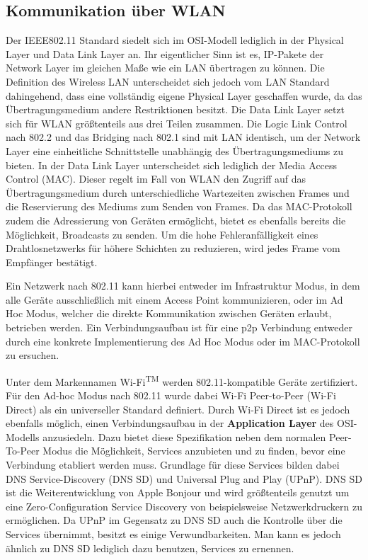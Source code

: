     \subsection{Kommunikation über WLAN}
        Der IEEE802.11 Standard siedelt sich im OSI-Modell lediglich in der Physical Layer und Data Link Layer an. Ihr eigentlicher Sinn ist es,
        IP-Pakete der Network Layer im gleichen Maße wie ein LAN übertragen zu können.
        Die Definition des Wireless LAN unterscheidet sich jedoch vom LAN Standard dahingehend, dass eine vollständig eigene Physical Layer geschaffen wurde,
        da das Übertragungsmedium andere Restriktionen besitzt. Die Data Link Layer setzt sich für WLAN größtenteils aus drei Teilen zusammen.
        Die Logic Link Control nach 802.2 und das Bridging nach 802.1 sind mit LAN identisch, um der Network Layer eine einheitliche Schnittstelle unabhängig des Übertragungsmediums zu bieten.
        In der Data Link Layer unterscheidet sich lediglich der Media Access Control (MAC).\cite[S.311]{Sauter}
        Dieser regelt im Fall von WLAN den Zugriff auf das Übertragungsmedium durch unterschiedliche Wartezeiten zwischen Frames und die Reservierung des Mediums zum Senden von Frames.
        Da das MAC-Protokoll zudem die Adressierung von Geräten ermöglicht, bietet es ebenfalls bereits die Möglichkeit, Broadcasts zu senden.
        Um die hohe Fehleranfälligkeit eines Drahtlosnetzwerks für höhere Schichten zu reduzieren, wird jedes Frame vom Empfänger bestätigt.\cite[S.325-327]{Sauter}
        
        Ein Netzwerk nach 802.11 kann hierbei entweder im Infrastruktur Modus, in dem alle Geräte ausschließlich mit einem Access Point kommunizieren,
        oder im Ad Hoc Modus, welcher die direkte Kommunikation zwischen Geräten erlaubt, betrieben werden.\cite[S.82]{Sikora}
        Ein Verbindungsaufbau ist für eine p2p Verbindung entweder durch eine konkrete Implementierung des Ad Hoc Modus oder
        im MAC-Protokoll zu ersuchen.

        Unter dem Markennamen Wi-Fi\textsuperscript{TM} werden 802.11-kompatible Geräte zertifiziert.\cite[S.80]{Sikora}
        Für den Ad-hoc Modus nach 802.11 wurde dabei Wi-Fi Peer-to-Peer (Wi-Fi Direct)\textregistered\cite{wifiDirect} als ein universeller Standard definiert.
        Durch Wi-Fi Direct ist es jedoch ebenfalls möglich, einen Verbindungsaufbau in der {\bf Application Layer} des OSI-Modells anzusiedeln.
        Dazu bietet diese Spezifikation neben dem normalen Peer-To-Peer Modus die Möglichkeit, Services anzubieten und zu finden, bevor eine Verbindung etabliert werden muss.
        Grundlage für diese Services bilden dabei DNS Service-Discovery (DNS SD) und Universal Plug and Play (UPnP).
        DNS SD ist die Weiterentwicklung von Apple Bonjour und wird größtenteils genutzt um eine Zero-Configuration Service Discovery von beispielsweise Netzwerkdruckern zu ermöglichen. Da UPnP im Gegensatz zu DNS SD auch die Kontrolle über die Services übernimmt, besitzt es einige Verwundbarkeiten. Man kann es jedoch ähnlich zu DNS SD lediglich dazu benutzen, Services zu ernennen.\cite{Esnaashari}
    

